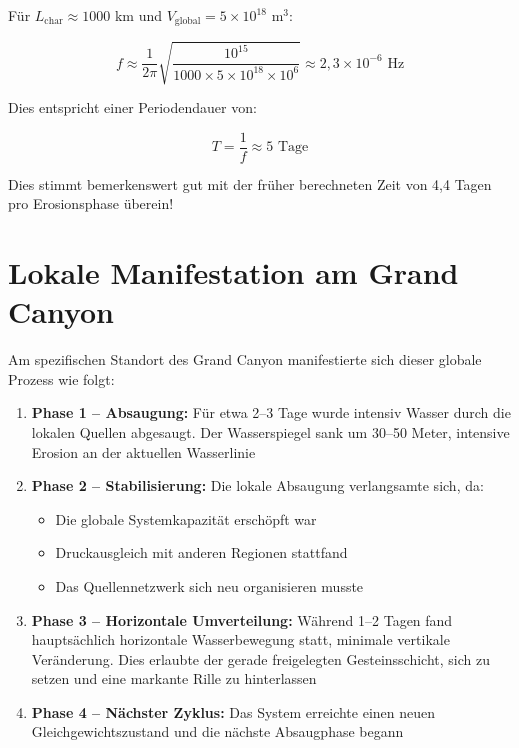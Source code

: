 ﻿\documentclass[12pt,a4paper]{report}
\begin{document}
Für $L_{\text{char}} \approx 1000$ km und $V_{\text{global}} = 5 \times 10^{18}$ m$^3$:

\begin{equation}
	f \approx \frac{1}{2\pi} \sqrt{\frac{10^{15}}{1000 \times 5 \times 10^{18} \times 10^6}} \approx 2{,}3 \times 10^{-6} \text{ Hz}
\end{equation}

Dies entspricht einer Periodendauer von:

\begin{equation}
	T = \frac{1}{f} \approx 5 \text{ Tage}
\end{equation}

Dies stimmt bemerkenswert gut mit der früher berechneten Zeit von 4,4 Tagen pro Erosionsphase überein!

\section{Lokale Manifestation am Grand Canyon}

Am spezifischen Standort des Grand Canyon manifestierte sich dieser globale Prozess wie folgt:

\begin{enumerate}
	\item \textbf{Phase 1 -- Absaugung:} Für etwa 2--3 Tage wurde intensiv Wasser durch die lokalen Quellen abgesaugt. Der Wasserspiegel sank um 30--50 Meter, intensive Erosion an der aktuellen Wasserlinie
	
	\item \textbf{Phase 2 -- Stabilisierung:} Die lokale Absaugung verlangsamte sich, da:
	\begin{itemize}
		\item Die globale Systemkapazität erschöpft war
		\item Druckausgleich mit anderen Regionen stattfand
		\item Das Quellennetzwerk sich neu organisieren musste
	\end{itemize}
	
	\item \textbf{Phase 3 -- Horizontale Umverteilung:} Während 1--2 Tagen fand hauptsächlich horizontale Wasserbewegung statt, minimale vertikale Veränderung. Dies erlaubte der gerade freigelegten Gesteinsschicht, sich zu setzen und eine markante Rille zu hinterlassen
	
	\item \textbf{Phase 4 -- Nächster Zyklus:} Das System erreichte einen neuen Gleichgewichtszustand und die nächste Absaugphase begann
\end{enumerate}
\end{document}
